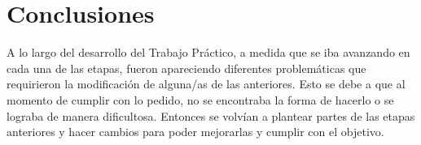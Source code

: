 \section{Conclusiones}

A lo largo del desarrollo del Trabajo Práctico, a medida que se iba avanzando en cada una de las etapas, fueron apareciendo diferentes problemáticas que requirieron la modificación de alguna/as de las anteriores. Esto se debe a que al momento de cumplir con lo pedido, no se encontraba la forma de hacerlo o se lograba de manera dificultosa. Entonces se volvían a plantear partes de las etapas anteriores y hacer cambios para poder mejorarlas y cumplir con el objetivo.

